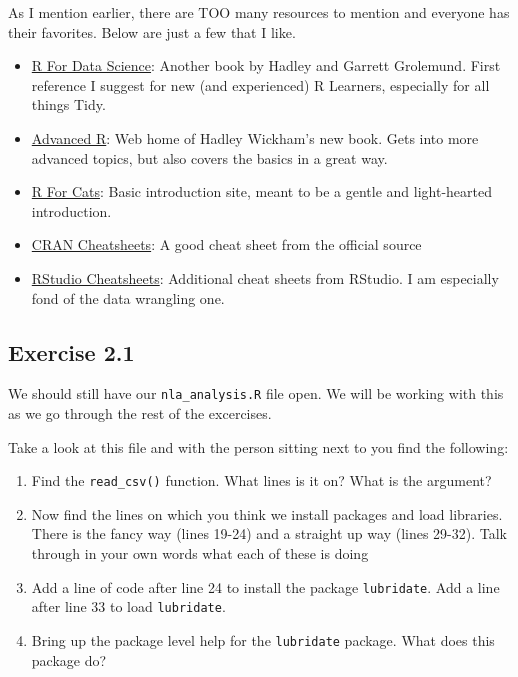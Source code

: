 \documentclass[]{article}
\providecommand{\tightlist}{%
  \setlength{\itemsep}{0pt}\setlength{\parskip}{0pt}}
\begin{document}
As I mention earlier, there are TOO many resources to mention and
everyone has their favorites. Below are just a few that I like.

\begin{itemize}
\tightlist
\item
  \href{http://r4ds.had.co.nz/}{R For Data Science}: Another book by
  Hadley and Garrett Grolemund. First reference I suggest for new (and
  experienced) R Learners, especially for all things Tidy.
\item
  \href{http://adv-r.had.co.nz/}{Advanced R}: Web home of Hadley
  Wickham's new book. Gets into more advanced topics, but also covers
  the basics in a great way.
\item
  \href{http://rforcats.net/}{R For Cats}: Basic introduction site,
  meant to be a gentle and light-hearted introduction.
\item
  \href{http://cran.r-project.org/doc/contrib/Short-refcard.pdf}{CRAN
  Cheatsheets}: A good cheat sheet from the official source
\item
  \href{http://www.rstudio.com/resources/cheatsheets/}{RStudio
  Cheatsheets}: Additional cheat sheets from RStudio. I am especially
  fond of the data wrangling one.
\end{itemize}

\hypertarget{exercise-2.1}{%
\subsection{Exercise 2.1}\label{exercise-2.1}}

We should still have our \texttt{nla\_analysis.R} file open. We will be
working with this as we go through the rest of the excercises.

Take a look at this file and with the person sitting next to you find
the following:

\begin{enumerate}
\def\labelenumi{\arabic{enumi}.}
\tightlist
\item
  Find the \texttt{read\_csv()} function. What lines is it on? What is
  the argument?
\item
  Now find the lines on which you think we install packages and load
  libraries. There is the fancy way (lines 19-24) and a straight up way
  (lines 29-32). Talk through in your own words what each of these is
  doing
\item
  Add a line of code after line 24 to install the package
  \texttt{lubridate}. Add a line after line 33 to load
  \texttt{lubridate}.
\item
  Bring up the package level help for the \texttt{lubridate} package.
  What does this package do?
\end{enumerate}
\end{document}
